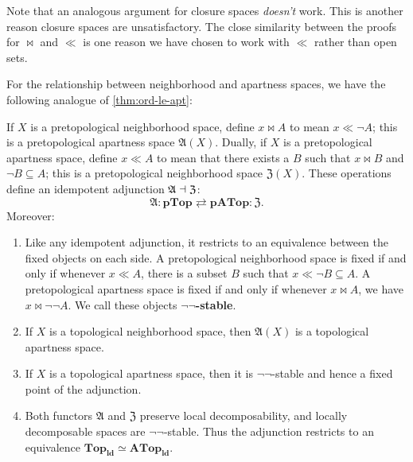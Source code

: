 \documentclass{article}
\def\cpl#1{\neg #1}
\def\anti{\mathfrak{A}}
\def\neigh{\mathfrak{Z}}
\def\nn{\ensuremath{\neg\neg}}
\def\PTop{\mathbf{pTop}}
\def\ldTop{\mathbf{Top}_{\mathbf{ld}}}
\def\APTop{\mathbf{pATop}}
\def\ldATop{\mathbf{ATop}_{\mathbf{ld}}}
\begin{document}
Note that an analogous argument for closure spaces \emph{doesn't} work.
This is another reason closure spaces are unsatisfactory.
The close similarity between the proofs for $\bowtie$ and $\ll$ is one reason we have chosen to work with $\ll$ rather than open sets.

For the relationship between neighborhood and apartness spaces, we have the following analogue of \cref{thm:ord-le-apt}:

\begin{thm}\label{thm:top-ll-bowtie}
  If $X$ is a pretopological neighborhood space, define $x\bowtie A$ to mean $x\ll \cpl{A}$; this is a pretopological apartness space $\anti(X)$.
  Dually, if $X$ is a pretopological apartness space, define $x\ll A$ to mean that there exists a $B$ such that $x\bowtie B$ and $\cpl{B}\subseteq A$; this is a pretopological neighborhood space $\neigh(X)$.
  These operations define an idempotent adjunction $\anti\adj \neigh$:
  \[ \anti : \PTop \rightleftarrows \APTop : \neigh. \]
  Moreover:
  \begin{enumerate}
  \item Like any idempotent adjunction, it restricts to an equivalence between the fixed objects on each side.
    A pretopological neighborhood space is fixed if and only if whenever $x\ll A$, there is a subset $B$ such that $x\ll \cpl{B} \subseteq A$.
    A pretopological apartness space is fixed if and only if whenever $x\bowtie A$, we have $x\bowtie \cpl{\cpl{A}}$.
    We call these objects \textbf{\nn-stable}.
  \item If $X$ is a topological neighborhood space, then $\anti(X)$ is a topological apartness space.
  \item If $X$ is a topological apartness space, then it is \nn-stable and hence a fixed point of the adjunction.
  \item Both functors $\anti$ and $\neigh$ preserve local decomposability, and locally decomposable spaces are \nn-stable.
    Thus the adjunction restricts to an equivalence $\ldTop \simeq \ldATop$.
    \label{item:top-ll-bowtie-equiv}
  \end{enumerate}
\end{thm}
\end{document}
